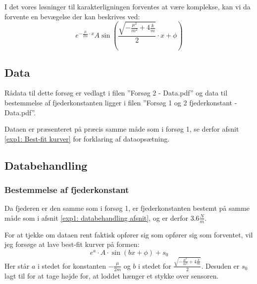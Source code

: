 I det vores løsninger til karakterligningen forventes at være komplekse, kan vi da forvente en bevægelse der kan beskrives ved:
$$e^{-\frac{\mu}{2m} \cdot x}A\sin(\frac{\sqrt{-\frac{\mu^2}{m^2}+4\frac{k}{m}}}{2} \cdot x+\phi)$$
\subsection{Data}
Rådata til dette forsøg er vedlagt i filen ''Forsøg 2 - Data.pdf'' og data til bestemmelse af fjederkonstanten ligger i filen ''Forsøg 1 og 2 fjederkonstant - Data.pdf''. 

Dataen er præsenteret på præcis samme måde som i forsøg 1, se derfor afsnit \ref{exp1: Best-fit kurver} for forklaring af dataopsætning.



\subsection{Databehandling}
\subsubsection{Bestemmelse af fjederkonstant}
Da fjederen er den samme som i forsøg 1, er fjederkonstanten bestemt på samme måde som i afsnit \ref{exp1: databehandling afsnit}, og er derfor $3.6\frac{N}{m}$.

For at tjekke om dataen rent faktisk opfører sig som opfører sig som forventet, vil jeg forsøge at lave best-fit kurver på formen:
$$e^a \cdot A \cdot \sin (bx+\phi)+s_0$$
Her står $a$ i stedet for konstanten $-\frac{\mu}{2m}$ og $b$ i stedet for 
$\frac{\sqrt{-\frac{\mu^2}{m^2}+4\frac{k}{m}}}{2}$.
Desuden er $s_0$ lagt til for at tage højde for, at loddet hænger et stykke over sensoren.

